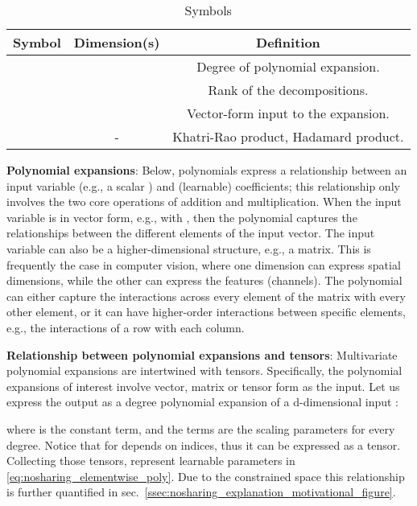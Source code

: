 \documentclass[runningheads]{llncs}
\providecommand\eg{e.g.,}
\begin{document}
\begin{table}[]
    \caption{Symbols}
    \label{tbl:nosharing_primary_symbols}
    \centering
    \begin{tabular}{|c | c | c|}
    \toprule
    Symbol 	& Dimension(s) 		&	Definition \\
    \midrule
     		            & 		            &	Degree of polynomial expansion. \\
     		            & 		            & Rank of the decompositions. \\
                &                       & Vector-form input to the expansion. \\
              &   -       & Khatri-Rao product, Hadamard product. \\
     \hline
    \end{tabular}
\end{table}



 

\noindent\textbf{Polynomial expansions}: Below, 
polynomials express a relationship between an input variable (\eg{} a scalar ) and (learnable) coefficients; this relationship only involves the two core operations of addition and multiplication. 
When the input variable is in vector form, \eg{}  with , then the polynomial captures the relationships between the different elements of the input vector. 
The input variable can also be a higher-dimensional structure, \eg{} a matrix. This is frequently the case in computer vision, where one dimension can express spatial dimensions, while the other can express the features (channels). The polynomial can either capture the interactions across every element of the matrix with every  other element, or it can have higher-order interactions between specific elements, \eg{} the interactions of a row with each column.

\noindent\textbf{Relationship between polynomial expansions and tensors}: Multivariate polynomial expansions are intertwined with tensors. Specifically, the polynomial expansions of interest involve vector, matrix or tensor form as the input. 
Let us express the output   as a  degree polynomial expansion of a d-dimensional input :

where  is the constant term, and the  terms are the scaling parameters for every degree. Notice that  for  depends on  indices, thus it can be expressed as a tensor. Collecting those tensors,  represent learnable parameters in \eqref{eq:nosharing_elementwise_poly}. Due to the constrained space this relationship is further quantified in sec.~\ref{ssec:nosharing_explanation_motivational_figure}.
\end{document}
